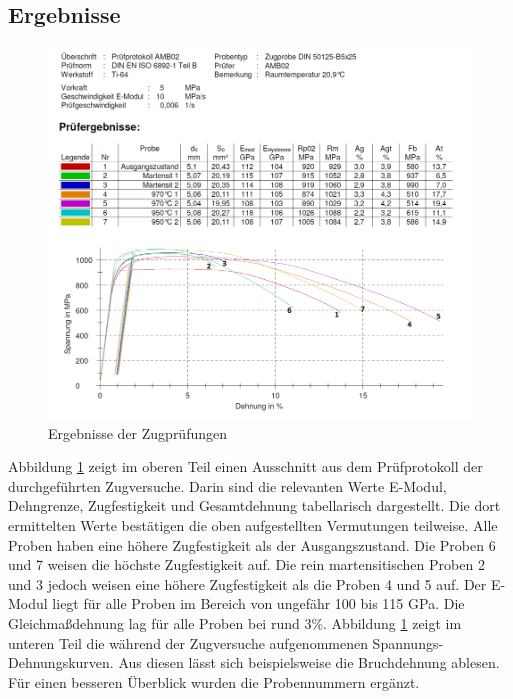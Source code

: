 \documentclass[a4paper, 11pt]{tubsreprt}
\begin{document}
\subsection*{Ergebnisse}

\begin{figure}
\centering
\includegraphics[angle=90, width=1\textwidth]{Bilder/haertepruefung.png}
\caption{Ergebnisse der Zugprüfungen}
\label{Ergebnisse der Zugpruefungen}
\end{figure}

Abbildung \ref{Ergebnisse der Zugpruefungen} zeigt im oberen Teil einen Ausschnitt aus dem Prüfprotokoll der durchgeführten Zugversuche. Darin sind die relevanten Werte E-Modul, Dehngrenze, Zugfestigkeit und Gesamtdehnung tabellarisch dargestellt. Die dort ermittelten Werte bestätigen die oben aufgestellten Vermutungen teilweise. Alle Proben haben eine höhere Zugfestigkeit als der Ausgangszustand. Die Proben 6 und 7 weisen die höchste Zugfestigkeit auf. Die rein martensitischen Proben 2 und 3 jedoch weisen eine höhere Zugfestigkeit als die Proben 4 und 5 auf. Der E-Modul liegt für alle Proben im Bereich von ungefähr 100 bis 115 GPa. Die Gleichmaßdehnung lag für alle Proben bei rund 3\%. Abbildung \ref{Ergebnisse der Zugpruefungen} zeigt im unteren Teil die während der Zugversuche aufgenommenen Spannungs-Dehnungskurven. Aus diesen lässt sich beispielsweise die Bruchdehnung ablesen. Für einen besseren Überblick wurden die Probennummern ergänzt.
\end{document}

